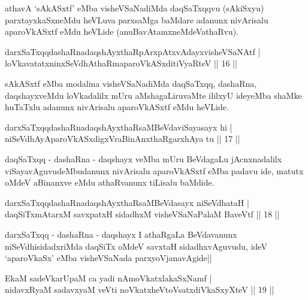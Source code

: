 \begin{artha}
athavA `sAkASxtf' eMba visheVSaNadiMda daqSaTxqqvu (sAkiSxyu) parxtayxkaSxneMdu heVLuva parxsaMga baMdare adanunx nivArisalu aparoVkASxtf eMdu heVLide (anuBavAtamxneMdeVathaRvu).
\end{artha}


\begin{shl}
darxSaTxqqdashaRnadaqshAyxthaRpArxpAtxvAdayxvisheVSaNAtf |\\
loVkavatatxninxSeVdhAthaRmaparoVkASxditiVyaRteV \hfill || 16 ||
\end{shl}

\begin{artha}
sAkASxtf eMba modalina visheVSaNadiMda daqSaTxqq, dashaRna, daqshayxveMdu loVkadalilx mUru aMshagaLiruvaMte ililxyU ideyeMba shaMke huTaTxlu adanunx nivArisalu aparoVkASxtf eMdu heVLide.
\end{artha}

\begin{shl}
darxSaTxqqdashaRnadaqshAyxthaRsaMBeVdaviSayasayx hi |\\
niSeVdhAyAparoVkASxdigxVraBinAnxthaRgarxhAya tu \hfill || 17 ||
\end{shl}

\begin{artha}
daqSaTxqq - dashaRna - daqshayx veMba mUru BeVdagaLu jAcnxnadalilx  viSayavAguvudeMbudanunx nivArisalu aparoVkASxtf eMba padavu ide, matutx oMdeV aBinanxve eMdu athaRvanunx tiLisalu baMdide.
\end{artha}


\begin{shl}
darxSaTxqqdashaRnadaqshAyxthaRsaMBeVdasayx niSeVdhataH |\\
daqSiTxmAtarxM savxpatxH sidadhxM visheVSaNaPalaM BaveVtf \hfill || 18 ||
\end{shl}

\begin{artha}
darxSaTxqq - dashaRna - daqshayx I athaRgaLa BeVdavanunx niSeVdhisidadxriMda daqSiTx oMdeV savxtaH sidadhxvAguvudu, ideV `aparoVkaSx' eMba visheVSaNada parxyoVjanavAgide||
\end{artha}


\begin{shl}
EkaM sadeVkarUpaM ca yadi nAmoVkatxlakaSxNamf |\\
nidavxRyaM sadavxyaM veVti noVkatxheVtoVsatxdiVkaSxyXteV \hfill || 19 ||
\end{shl}

